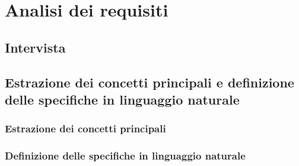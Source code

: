 \chapter{Analisi dei requisiti}
\section{Intervista}
\section{Estrazione dei concetti principali e definizione delle specifiche in linguaggio naturale}
\subsection{Estrazione dei concetti principali}
\subsection{Definizione delle specifiche in linguaggio naturale}
